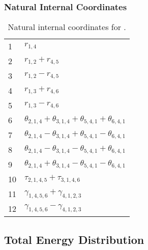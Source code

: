 \documentclass[10pt,oneside]{article}
\begin{document}
\begin{table}[h!]
\subsubsection*{Natural Internal Coordinates}
\centering
\caption{Natural internal coordinates for .}
\small
\begin{tabular}{ll}
\toprule
  1   & $r_{1,4}$ \\
  2   & $r_{1,2} + r_{4,5}$ \\
  3   & $r_{1,2} - r_{4,5}$ \\
  4   & $r_{1,3} + r_{4,6}$ \\
  5   & $r_{1,3} - r_{4,6}$ \\
  6   & $\theta_{2,1,4} + \theta_{3,1,4} + \theta_{5,4,1} + \theta_{6,4,1}$ \\
  7   & $\theta_{2,1,4} - \theta_{3,1,4} + \theta_{5,4,1} - \theta_{6,4,1}$ \\
  8   & $\theta_{2,1,4} - \theta_{3,1,4} - \theta_{5,4,1} + \theta_{6,4,1}$ \\
  9   & $\theta_{2,1,4} + \theta_{3,1,4} - \theta_{5,4,1} - \theta_{6,4,1}$ \\
  10  & $\tau_{2,1,4,5} + \tau_{3,1,4,6}$ \\
  11  & $\gamma_{1,4,5,6} + \gamma_{4,1,2,3}$ \\
  12  & $\gamma_{1,4,5,6} - \gamma_{4,1,2,3}$ \\
\bottomrule
\end{tabular}
\end{table}

\begin{table}
\subsection*{Total Energy Distribution}
\centering\end{table}

\clearpage

\subsection{}
\end{document}
